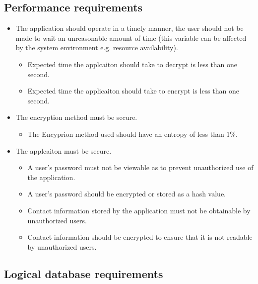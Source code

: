\begin{itemize}
\end{itemize}

\subsection{Performance requirements}
\begin{itemize}
\item The application should operate in a timely manner, the user should not be made to wait an unreasonable amount of time (this variable can be affected by the system environment e.g. resource availability).
\begin{itemize}
\item Expected time the applcaiton should take to decrypt is less than one second.
\item Expected time the applicaiton should take to encrypt is less than one second.
\end{itemize}
\item The encryption method must be secure.
\begin{itemize}
\item The Encyprion method used should have an entropy of less than 1\%.
\end{itemize}
\item The applcaiton must be secure.
\begin{itemize}
\item A user’s password must not be viewable as to prevent unauthorized use of the application.
\item A user’s password should be encrypted or stored as a hash value.
\item Contact information stored by the application must not be obtainable by unauthorized users.
\item Contact information should be encrypted to ensure that it is not readable by unauthorized users.
\end{itemize}
\end{itemize}

\subsection{Logical database requirements}

